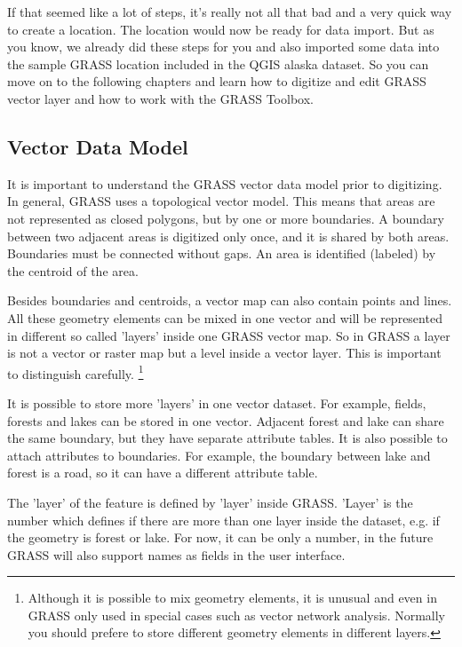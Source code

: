 If that seemed like a lot of steps, it's really not all that bad and a very 
quick way to create a location. The location  would now be
ready for data import. But as you know, we already did these steps for you and
also imported some data into the sample GRASS location 
included in the QGIS alaska dataset. So you can move on to the following
chapters and learn how to digitize and edit GRASS vector layer and how to
work with the GRASS Toolbox. 

\subsection{Vector Data Model}\label{label_vectmodel}

It is important to understand the GRASS vector data model prior to
digitizing. In general, GRASS uses a topological
vector model. This means that areas are not represented
as closed polygons, but by one or more boundaries. A boundary between two
adjacent areas is digitized only once, and it is shared by both areas.
Boundaries must be connected without gaps. An area is identified (labeled) by
the centroid of the area.

Besides boundaries and centroids, a vector map can also contain
points and lines. All these geometry elements can be mixed
in one vector and will be represented in different so called 'layers' inside
one GRASS vector map. So in GRASS a layer is not a vector or raster map but a
level inside a vector layer. This is important to distinguish carefully.
\footnote{Although it
is possible to mix geometry elements, it is unusual and even in GRASS only
used in special cases such as vector network analysis. Normally you should
prefere to store different geometry elements in different layers.}

It is possible to store more 'layers' in one vector dataset. For example,
fields, forests and lakes can be stored in one vector. Adjacent
forest and lake can share the same boundary, but they have separate attribute
tables. It is also possible to attach attributes to boundaries. For example,
the boundary between lake and forest is a road, so it can have a different 
attribute table.
 
The 'layer' of the feature is defined by 'layer' inside GRASS.
'Layer' is the number which defines if there are more than one layer inside the 
dataset, e.g. if the geometry is forest or lake.
For now, it can be only a number, in the future GRASS will also support  
names as fields in the user interface.


